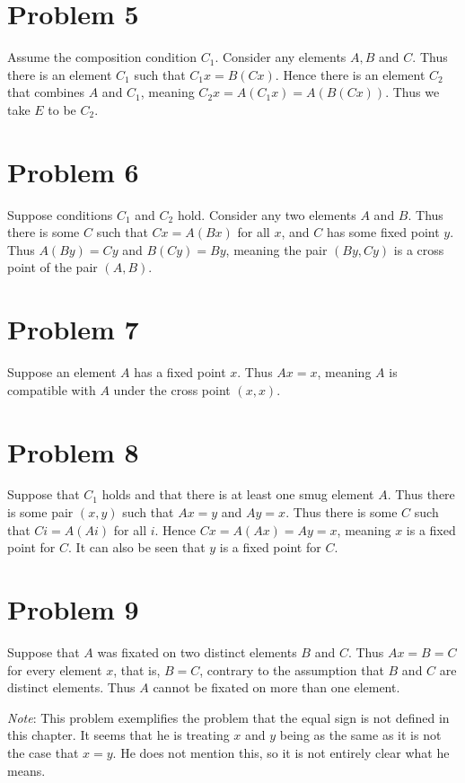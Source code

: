 \documentclass{article}
\theoremstyle{definition}
\begin{document}
\section*{Problem 5}
Assume the composition condition $C_1$. Consider any elements $A,B$ and $C$. Thus there is an element $C_1$ such that $C_1x=B(Cx)$. Hence there is an element $C_2$ that combines $A$ and $C_1$, 
meaning $C_2x=A(C_1x)=A(B(Cx))$. Thus we take $E$ to be $C_2$.

\section*{Problem 6}
Suppose conditions $C_1$ and $C_2$ hold. Consider any two elements $A$ and $B$. Thus there is some $C$ such that $Cx=A(Bx)$ for all $x$, and $C$ has some fixed point $y$. 
Thus $A(By)=Cy$ and $B(Cy)=By$, meaning the pair $(By,Cy)$ is a cross point of the pair $(A,B)$.

\section*{Problem 7}
Suppose an element $A$ has a fixed point $x$. Thus $Ax=x$, meaning $A$ is compatible with $A$ under the cross point $(x,x)$.

\section*{Problem 8}
Suppose that $C_1$ holds and that there is at least one smug element $A$. Thus there is some pair $(x,y)$ such that $Ax=y$ and $Ay=x$. Thus there is some $C$ such that $Ci=A(Ai)$ for all $i$. 
Hence $Cx=A(Ax)=Ay=x$, meaning $x$ is a fixed point for $C$. It can also be seen that $y$ is a fixed point for $C$.

\section*{Problem 9}
Suppose that $A$ was fixated on two distinct elements $B$ and $C$. Thus $Ax=B=C$ for every element $x$, that is, $B=C$, contrary to the assumption that $B$ and $C$ are distinct elements. Thus 
$A$ cannot be fixated on more than one element.


\textit{Note}: This problem exemplifies the problem that the equal sign is not defined in this chapter. 
It seems that he is treating $x$ and $y$ being  
as the same as it is not the case that $x=y$. He does not mention this, so it is not entirely clear what he means.
\end{document}

